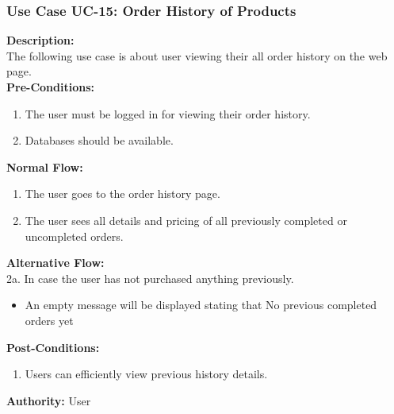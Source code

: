 \subsubsection{Use Case UC-15: Order History of Products }
\textbf{Description:}\\
The following use case is about user viewing their all order history on the web page. 
\\
\textbf{Pre-Conditions:}
\begin{enumerate}
    \item The user must be logged in for viewing their order history.
\item Databases should be available. 
\end{enumerate}
\textbf{Normal Flow:}\\
\begin{enumerate}
\item The user goes to the order history page. 
\item The user sees all details and pricing of all previously completed or uncompleted orders. \end{enumerate}
\textbf{Alternative Flow:}\\
2a. In case the user has not purchased anything previously. 
\begin{itemize}
\item 	An empty message will be displayed stating that No previous completed orders yet
\end{itemize}

\textbf{Post-Conditions: }
\begin{enumerate}
\item Users can efficiently view previous history details.
\end{enumerate}
\textbf{Authority:}
User
